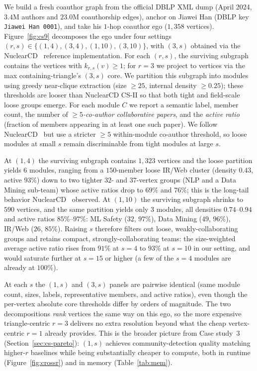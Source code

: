 \label{sec:cs-viz}
We build a fresh coauthor graph from the official DBLP XML dump (April 2024, $3.4$M authors and $23.0$M coauthorship edges), anchor on Jiawei Han (DBLP key \texttt{Jiawei Han 0001}), and take his $1$-hop coauthor ego ($1{,}358$ vertices).
%
Figure~\ref{fig:cs9} decomposes the ego under four settings $(r,s)\!\in\!\{(1,4),(3,4),(1,10),(3,10)\}$, with $(3,s)$ obtained via the NuclearCD~\cite{NuclearCD} reference implementation.
%
For each $(r,s)$, the surviving subgraph contains the vertices with $k_{r,s}(v)\!\ge\!1$; for $r{=}3$ we project to vertices via the max containing-triangle's $(3,s)$ core.
%
We partition this subgraph into modules using greedy near-clique extraction (size $\ge\!25$, internal density $\ge\!0.25$); these thresholds are looser than NuclearCD CS-II so that both tight and field-scale loose groups emerge.
%
For each module $C$ we report a semantic label, member count, the number of \emph{$\ge\!5$-co-author collaborative papers}, and the \emph{active ratio} (fraction of members appearing in at least one such paper).
%
We follow NuclearCD~\cite{NuclearCD} but use a stricter $\ge\!5$ within-module co-author threshold, so loose modules at small $s$ remain discriminable from tight modules at large $s$.

At $(1,4)$ the surviving subgraph contains $1{,}323$ vertices and the loose partition yields $6$ modules, ranging from a $150$-member loose IR/Web cluster (density $0.43$, active $93\%$) down to two tighter $32$- and $37$-vertex groups (NLP and a Data Mining sub-team) whose active ratios drop to $69\%$ and $76\%$; this is the long-tail behavior NuclearCD~\cite{NuclearCD} observed.
%
At $(1,10)$ the surviving subgraph shrinks to $590$ vertices, and the same partition yields only $3$ modules, all densities $0.74$--$0.94$ and active ratios $85\%$--$97\%$: ML Safety ($32$, $97\%$), Data Mining ($49$, $96\%$), IR/Web ($26$, $85\%$).
%
Raising $s$ therefore filters out loose, weakly-collaborating groups and retains compact, strongly-collaborating teams: the size-weighted average active ratio rises from $91\%$ at $s\!=\!4$ to $93\%$ at $s\!=\!10$ in our setting, and would saturate further at $s\!=\!15$ or higher (a few of the $s\!=\!4$ modules are already at $100\%$).

At each $s$ the $(1,s)$ and $(3,s)$ panels are pairwise identical (same module count, sizes, labels, representative members, and active ratios), even though the per-vertex absolute core thresholds differ by orders of magnitude.
%
The two decompositions \emph{rank} vertices the same way on this ego, so the more expensive triangle-centric $r\!=\!3$ delivers no extra resolution beyond what the cheap vertex-centric $r\!=\!1$ already provides.
%
This is the broader picture from Case study~3 (Section~\ref{sec:cs-pareto}): $(1,s)$ achieves community-detection quality matching higher-$r$ baselines while being substantially cheaper to compute, both in runtime (Figure~\ref{fig:crossr}) and in memory (Table~\ref{tab:mem}).

